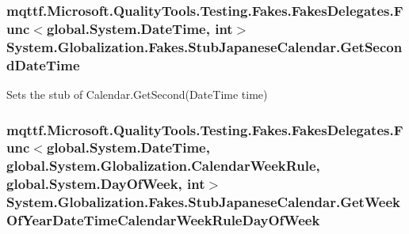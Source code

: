 \hypertarget{class_system_1_1_globalization_1_1_fakes_1_1_stub_japanese_calendar_a66ee129dca178962020b3974aeaad779}{
\subsubsection[{Get\-Second\-Date\-Time}]{\setlength{\rightskip}{0pt plus 5cm}mqttf.\-Microsoft.\-Quality\-Tools.\-Testing.\-Fakes.\-Fakes\-Delegates.\-Func$<$global.\-System.\-Date\-Time, int$>$ System.\-Globalization.\-Fakes.\-Stub\-Japanese\-Calendar.\-Get\-Second\-Date\-Time}}\label{class_system_1_1_globalization_1_1_fakes_1_1_stub_japanese_calendar_a66ee129dca178962020b3974aeaad779}


Sets the stub of Calendar.\-Get\-Second(\-Date\-Time time)

\hypertarget{class_system_1_1_globalization_1_1_fakes_1_1_stub_japanese_calendar_a63f6e0121d4b1bb17a61fcbc84b6b928}{
\subsubsection[{Get\-Week\-Of\-Year\-Date\-Time\-Calendar\-Week\-Rule\-Day\-Of\-Week}]{\setlength{\rightskip}{0pt plus 5cm}mqttf.\-Microsoft.\-Quality\-Tools.\-Testing.\-Fakes.\-Fakes\-Delegates.\-Func$<$global.\-System.\-Date\-Time, global.\-System.\-Globalization.\-Calendar\-Week\-Rule, global.\-System.\-Day\-Of\-Week, int$>$ System.\-Globalization.\-Fakes.\-Stub\-Japanese\-Calendar.\-Get\-Week\-Of\-Year\-Date\-Time\-Calendar\-Week\-Rule\-Day\-Of\-Week}}\label{class_system_1_1_globalization_1_1_fakes_1_1_stub_japanese_calendar_a63f6e0121d4b1bb17a61fcbc84b6b928}


